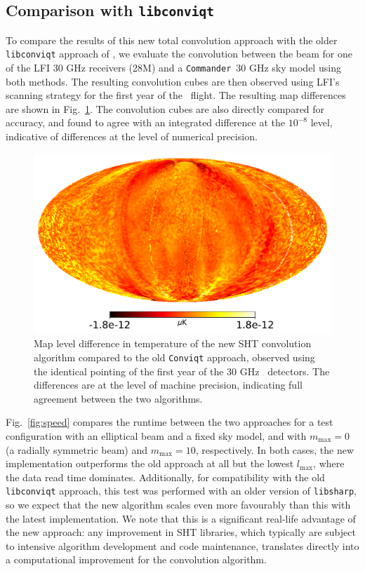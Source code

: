 \documentclass[twocolumn]{aa}
\def\commander{\texttt{Commander}}
\begin{document}
\subsection{Comparison with \texttt{libconviqt}}

To compare the results of this new total convolution approach with the older \texttt{libconviqt} approach of \citet{conviqt}, we evaluate the convolution between the beam for one of the LFI 30 GHz receivers (28M) and a \commander\ 30 GHz sky model \citep{bp13,bp14} using both methods. The resulting convolution cubes are then observed using LFI's scanning strategy for the first year of the \Planck\ flight. The resulting map differences are shown in Fig.~\ref{fig:differences}. The convolution cubes are also directly compared for accuracy, and found to agree with an integrated difference at the $10^{-8}$ level, indicative of differences at the level of numerical precision.

\begin{figure}[t]
  \center
  \includegraphics[width=\linewidth]{scripts/conviqt_diff_map.pdf}
  \caption{Map level difference in temperature of the new SHT convolution algorithm compared to the old \texttt{Conviqt} approach, observed using the identical pointing of the first year of the 30 GHz \Planck\ detectors. The differences are at the level of machine precision, indicating full agreement between the two algorithms. 
  }\label{fig:differences}
\end{figure}

Fig.~\ref{fig:speed} compares the runtime between the two approaches for a test configuration with an elliptical beam and a fixed sky model, and with $m_\mathrm{max}=0$ (a radially symmetric beam) and $m_\mathrm{max}=10$, respectively. In both cases, the new implementation outperforms the old approach at all but the lowest $l_\mathrm{max}$, where the data read time dominates. Additionally, for compatibility with the old \texttt{libconviqt} approach, this test was performed with an older version of \texttt{libsharp}, so we expect that the new algorithm scales even more favourably than this with the latest implementation. We note that this is a significant real-life advantage of the new approach: any improvement in SHT libraries, which typically are subject to intensive algorithm development and code maintenance, translates directly into a computational improvement for the convolution algorithm. 
\end{document}
